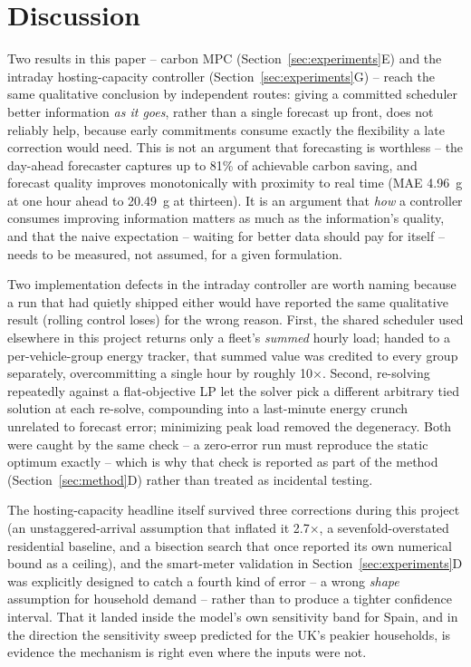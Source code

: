 \documentclass[journal]{IEEEtran}
\begin{document}
\section{Discussion}
\label{sec:discussion}

Two results in this paper -- carbon MPC (Section~\ref{sec:experiments}E) and the intraday hosting-capacity controller (Section~\ref{sec:experiments}G) -- reach the same qualitative conclusion by independent routes: giving a committed scheduler better information \emph{as it goes}, rather than a single forecast up front, does not reliably help, because early commitments consume exactly the flexibility a late correction would need. This is not an argument that forecasting is worthless -- the day-ahead forecaster captures up to 81\% of achievable carbon saving, and forecast quality improves monotonically with proximity to real time (MAE 4.96~g at one hour ahead to 20.49~g at thirteen). It is an argument that \emph{how} a controller consumes improving information matters as much as the information's quality, and that the naive expectation -- waiting for better data should pay for itself -- needs to be measured, not assumed, for a given formulation.

Two implementation defects in the intraday controller are worth naming because a run that had quietly shipped either would have reported the same qualitative result (rolling control loses) for the wrong reason. First, the shared scheduler used elsewhere in this project returns only a fleet's \emph{summed} hourly load; handed to a per-vehicle-group energy tracker, that summed value was credited to every group separately, overcommitting a single hour by roughly 10$\times$. Second, re-solving repeatedly against a flat-objective LP let the solver pick a different arbitrary tied solution at each re-solve, compounding into a last-minute energy crunch unrelated to forecast error; minimizing peak load removed the degeneracy. Both were caught by the same check -- a zero-error run must reproduce the static optimum exactly -- which is why that check is reported as part of the method (Section~\ref{sec:method}D) rather than treated as incidental testing.

The hosting-capacity headline itself survived three corrections during this project (an unstaggered-arrival assumption that inflated it 2.7$\times$, a sevenfold-overstated residential baseline, and a bisection search that once reported its own numerical bound as a ceiling), and the smart-meter validation in Section~\ref{sec:experiments}D was explicitly designed to catch a fourth kind of error -- a wrong \emph{shape} assumption for household demand -- rather than to produce a tighter confidence interval. That it landed inside the model's own sensitivity band for Spain, and in the direction the sensitivity sweep predicted for the UK's peakier households, is evidence the mechanism is right even where the inputs were not.
\end{document}

